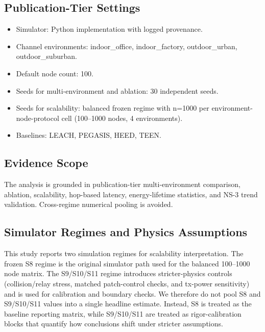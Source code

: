 ﻿\documentclass[sensors,article,submit,moreauthors,pdftex]{Definitions/mdpi}
\begin{document}
\subsection{Publication-Tier Settings}
\begin{itemize}
\item Simulator: Python implementation with logged provenance.
\item Channel environments: indoor\_office, indoor\_factory, outdoor\_urban, outdoor\_suburban.
\item Default node count: 100.
\item Seeds for multi-environment and ablation: 30 independent seeds.
\item Seeds for scalability: balanced frozen regime with n=1000 per environment-node-protocol cell (100--1000 nodes, 4 environments).
\item Baselines: LEACH, PEGASIS, HEED, TEEN.
\end{itemize}

\subsection{Evidence Scope}
The analysis is grounded in publication-tier multi-environment comparison, ablation, scalability, hop-based latency, energy-lifetime statistics, and NS-3 trend validation. Cross-regime numerical pooling is avoided.

\subsection{Simulator Regimes and Physics Assumptions}
This study reports two simulation regimes for scalability interpretation. The frozen S8 regime is the original simulator path used for the balanced 100--1000 node matrix. The S9/S10/S11 regime introduces stricter-physics controls (collision/relay stress, matched patch-control checks, and tx-power sensitivity) and is used for calibration and boundary checks. We therefore do not pool S8 and S9/S10/S11 values into a single headline estimate. Instead, S8 is treated as the baseline reporting matrix, while S9/S10/S11 are treated as rigor-calibration blocks that quantify how conclusions shift under stricter assumptions.
\end{document}
